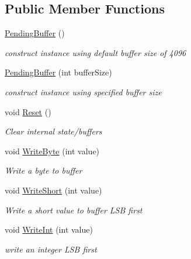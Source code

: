\subsection*{Public Member Functions}
\begin{DoxyCompactItemize}
\item 
\hyperlink{class_i_c_sharp_code_1_1_sharp_zip_lib_1_1_zip_1_1_compression_1_1_pending_buffer_a1321c17e1246bfd949be6931cadef03d}{Pending\+Buffer} ()
\begin{DoxyCompactList}\small\item\em construct instance using default buffer size of 4096 \end{DoxyCompactList}\item 
\hyperlink{class_i_c_sharp_code_1_1_sharp_zip_lib_1_1_zip_1_1_compression_1_1_pending_buffer_a3097cb51b8024964380e603c82ced157}{Pending\+Buffer} (int buffer\+Size)
\begin{DoxyCompactList}\small\item\em construct instance using specified buffer size \end{DoxyCompactList}\item 
void \hyperlink{class_i_c_sharp_code_1_1_sharp_zip_lib_1_1_zip_1_1_compression_1_1_pending_buffer_a29fb607f934954a99eac571e1bd703b4}{Reset} ()
\begin{DoxyCompactList}\small\item\em Clear internal state/buffers \end{DoxyCompactList}\item 
void \hyperlink{class_i_c_sharp_code_1_1_sharp_zip_lib_1_1_zip_1_1_compression_1_1_pending_buffer_a4eca88699314f9875c3ba116676814f3}{Write\+Byte} (int value)
\begin{DoxyCompactList}\small\item\em Write a byte to buffer \end{DoxyCompactList}\item 
void \hyperlink{class_i_c_sharp_code_1_1_sharp_zip_lib_1_1_zip_1_1_compression_1_1_pending_buffer_a639060dd1e220e5106bd3e285d0cf3b0}{Write\+Short} (int value)
\begin{DoxyCompactList}\small\item\em Write a short value to buffer L\+SB first \end{DoxyCompactList}\item 
void \hyperlink{class_i_c_sharp_code_1_1_sharp_zip_lib_1_1_zip_1_1_compression_1_1_pending_buffer_ae345066eaba7f773529fff6780b5c922}{Write\+Int} (int value)
\begin{DoxyCompactList}\small\item\em write an integer L\+SB first \end{DoxyCompactList}\item 

\end{DoxyCompactItemize}
